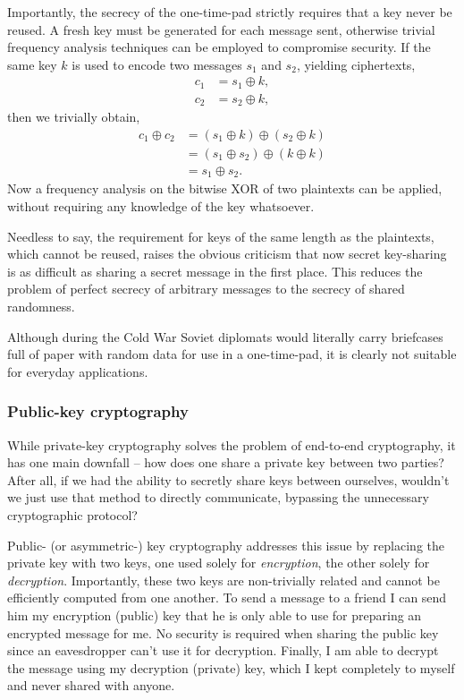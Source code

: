 Importantly, the secrecy of the one-time-pad strictly requires that a key never be reused. A fresh key must be generated for each message sent, otherwise trivial frequency analysis techniques can be employed to compromise security. If the same key $k$ is used to encode two messages $s_1$ and $s_2$, yielding ciphertexts,
\begin{align}
c_1&=s_1\oplus k,\nonumber\\
c_2&=s_2\oplus k,
\end{align}
then we trivially obtain,
\begin{align}
c_1 \oplus c_2 &= (s_1 \oplus k) \oplus (s_2 \oplus k) \nonumber \\
&= (s_1 \oplus s_2) \oplus (k \oplus k) \nonumber \\
&= s_1 \oplus s_2.
\end{align}
Now a frequency analysis on the bitwise XOR of two plaintexts can be applied, without requiring any knowledge of the key whatsoever.

Needless to say, the requirement for keys of the same length as the plaintexts, which cannot be reused, raises the obvious criticism that now secret key-sharing is as difficult as sharing a secret message in the first place. This reduces the problem of perfect secrecy of arbitrary messages to the secrecy of shared randomness. 

Although during the Cold War Soviet diplomats would literally carry briefcases full of paper with random data for use in a one-time-pad, it is clearly not suitable for everyday applications.

\subsubsection{Public-key cryptography}


While private-key cryptography solves the problem of end-to-end cryptography, it has one main downfall -- how does one share a private key between two parties? After all, if we had the ability to secretly share keys between ourselves, wouldn't we just use that method to directly communicate, bypassing the unnecessary cryptographic protocol?

Public- (or asymmetric-) key cryptography addresses this issue by replacing the private key with two keys, one used solely for \textit{encryption}, the other solely for \textit{decryption}. Importantly, these two keys are non-trivially related and cannot be efficiently computed from one another. To send a message to a friend I can send him my encryption (public) key that he is only able to use for preparing an encrypted message for me. No security is required when sharing the public key since an eavesdropper can't use it for decryption. Finally, I am able to decrypt the message using my decryption (private) key, which I kept completely to myself and never shared with anyone.

